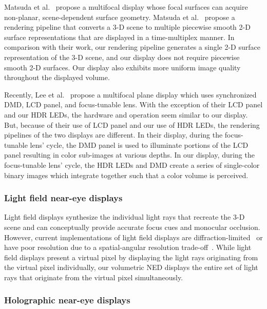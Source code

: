 Matsuda et al.~\cite{Matsuda2017focal} propose a multifocal display whose focal surfaces can acquire non-planar, scene-dependent surface geometry. Matsuda et al.~\cite{Matsuda2017focal} propose a rendering pipeline that converts a 3-D scene to multiple piecewise smooth 2-D surface representations that are displayed in a time-multiplex manner. In comparison with their work, our rendering pipeline generates a single 2-D surface representation of the 3-D scene, and our display does not require piecewise smooth 2-D surfaces. Our display also exhibits more uniform image quality throughout the displayed volume. 

Recently, Lee et al.~\cite{Lee2018Tomoreal,Lee2018Shape} propose a multifocal plane display which uses synchronized DMD, LCD panel, and focus-tunable lens. With the exception of their LCD panel and our HDR LEDs, the hardware and operation seem similar to our display. But, because of their use of LCD panel and our use of HDR LEDs, the rendering pipelines of the two displays are different. In their display, during the focus-tunable lens' cycle, the DMD panel is used to illuminate portions of the LCD panel resulting in color sub-images at various depths. In our display, during the focus-tunable lens' cycle, the HDR LEDs and DMD create a series of single-color binary images which integrate together such that a color volume is perceived. 


\subsubsection{Light field near-eye displays}
\label{sec:volumetric:light_field_displays}
Light field displays synthesize the individual light rays that recreate the 3-D scene and can conceptually provide accurate focus cues and monocular occlusion. However, current implementations of light field displays are diffraction-limited~\cite{Maimone2014Pinlight,Huang2015Light} or have poor resolution due to a spatial-angular resolution trade-off~\cite{Lanman2013near,Hua2014Three}. While light field displays present a virtual pixel by displaying the light rays originating from the virtual pixel individually, our volumetric NED displays the entire set of light rays that originate from the virtual pixel simultaneously.

\subsubsection{Holographic near-eye displays}
\label{sec:volumetric:holographic_displays}

